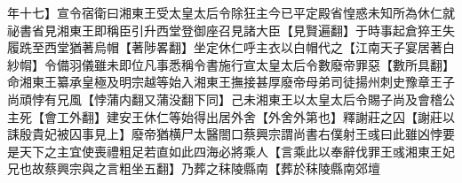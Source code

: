 年十七】宣令宿衛曰湘東王受太皇太后令除狂主今已平定殿省惶惑未知所為休仁就祕書省見湘東王即稱臣引升西堂登御座召見諸大臣【見賢遍翻】于時事起倉猝王失履跣至西堂猶著烏帽【著陟畧翻】坐定休仁呼主衣以白帽代之【江南天子宴居著白紗㡌】令備羽儀雖未即位凡事悉稱令書施行宣太皇太后令數廢帝罪惡【數所具翻】命湘東王纂承皇極及明宗越等始入湘東王撫接甚厚廢帝母弟司徒揚州刺史豫章王子尚頑悖有兄風【悖蒲内翻又蒲没翻下同】己未湘東王以太皇太后令賜子尚及會稽公主死【會工外翻】建安王休仁等始得出居外舍【外舍外第也】釋謝莊之囚【謝莊以誄殷貴妃被囚事見上】廢帝猶横尸太醫閤口蔡興宗謂尚書右僕射王彧曰此雖凶悖要是天下之主宜使喪禮粗足若直如此四海必將乘人【言乘此以奉辭伐罪王彧湘東王妃兄也故蔡興宗與之言粗坐五翻】乃葬之秣陵縣南【葬於秣陵縣南郊壇